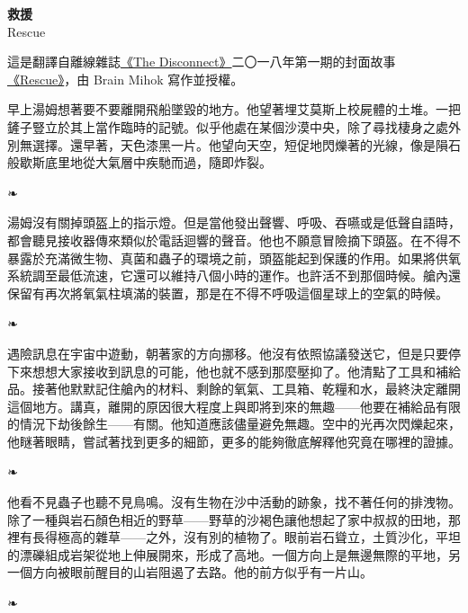 \documentclass[10pt]{article}
\begin{document}
\begin{flushleft}
\textbf{救援}\\
Rescue\\
\end{flushleft}
\vspace{3em}

這是翻譯自離線雜誌\href{https://thedisconnect.co/}{《The
Disconnect》}二〇一八年第一期的封面故事\href{https://thedisconnect.co/one/rescue}{《Rescue》}，由
Brain Mihok 寫作並授權。
\vspace{1em}

早上湯姆想著要不要離開飛船墜毀的地方。他望著埋艾莫斯上校屍體的土堆。一把鏟子豎立於其上當作臨時的記號。似乎他處在某個沙漠中央，除了尋找棲身之處外別無選擇。還早著，天色漆黑一片。他望向天空，短促地閃爍著的光線，像是隕石般歇斯底里地從大氣層中疾馳而過，隨即炸裂。

\begin{center}❧\end{center}

湯姆沒有關掉頭盔上的指示燈。但是當他發出聲響、呼吸、吞嚥或是低聲自語時，都會聽見接收器傳來類似於電話迴響的聲音。他也不願意冒險摘下頭盔。在不得不暴露於充滿微生物、真菌和蟲子的環境之前，頭盔能起到保護的作用。如果將供氧系統調至最低流速，它還可以維持八個小時的運作。也許活不到那個時候。艙內還保留有再次將氧氣柱填滿的裝置，那是在不得不呼吸這個星球上的空氣的時候。

\begin{center}❧\end{center}

遇險訊息在宇宙中遊動，朝著家的方向挪移。他沒有依照協議發送它，但是只要停下來想想大家接收到訊息的可能，他也就不感到那麼壓抑了。他清點了工具和補給品。接著他默默記住艙內的材料、剩餘的氧氣、工具箱、乾糧和水，最終決定離開這個地方。講真，離開的原因很大程度上與即將到來的無趣——他要在補給品有限的情況下劫後餘生——有關。他知道應該儘量避免無趣。空中的光再次閃爍起來，他瞇著眼睛，嘗試著找到更多的細節，更多的能夠徹底解釋他究竟在哪裡的證據。

\begin{center}❧\end{center}

他看不見蟲子也聽不見鳥鳴。沒有生物在沙中活動的跡象，找不著任何的排洩物。除了一種與岩石顏色相近的野草——野草的沙褐色讓他想起了家中叔叔的田地，那裡有長得極高的雜草——之外，沒有別的植物了。眼前岩石聳立，土質沙化，平坦的漂礫組成岩架從地上伸展開來，形成了高地。一個方向上是無邊無際的平地，另一個方向被眼前醒目的山岩阻遏了去路。他的前方似乎有一片山。

\begin{center}❧\end{center}
\end{document}
